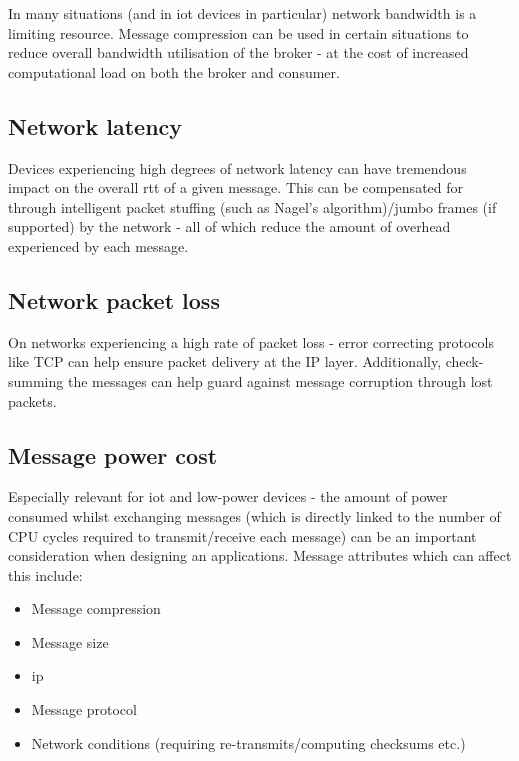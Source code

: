 In many situations (and in \gls{iot} devices in particular) network bandwidth is
a limiting resource. Message compression can be used in certain situations to
reduce overall bandwidth utilisation of the broker - at the cost of increased
computational load on both the broker and consumer.

\subsection{Network latency}
\label{sub:Network latency}

Devices experiencing high degrees of network latency can have tremendous impact
on the overall \gls{rtt} of a given message. This can be compensated for through
intelligent packet stuffing (such as Nagel's algorithm)/jumbo frames (if
supported) by the network - all of which reduce the amount of overhead
experienced by each message.

\subsection{Network packet loss}
\label{sub:Network packet loss}

On networks experiencing a high rate of packet loss - error correcting protocols
like TCP can help ensure packet delivery at the IP layer. Additionally,
check-summing the messages can help guard against message corruption through
lost packets.

\subsection{Message power cost}
\label{sub:Message power cost}

Especially relevant for \gls{iot} and low-power devices - the amount of power
consumed whilst exchanging messages (which is directly linked to the number of
CPU cycles required to transmit/receive each message) can be an important
consideration when designing an applications. Message attributes which can
affect this include:

\begin{itemize}
  \item Message compression
  \item Message size
  \item \gls{ip}
  \item Message protocol
  \item Network conditions (requiring re-transmits/computing checksums etc.)
\end{itemize}

